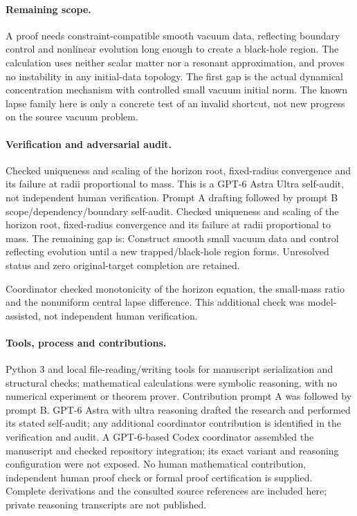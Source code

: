 \documentclass[11pt]{article}
\begin{document}
\paragraph{Remaining scope.} A proof needs constraint-compatible smooth vacuum data, reflecting boundary control and nonlinear evolution long enough to create a black-hole region. The calculation uses neither scalar matter nor a resonant approximation, and proves no instability in any initial-data topology. The first gap is the actual dynamical concentration mechanism with controlled small vacuum initial norm. The known lapse family here is only a concrete test of an invalid shortcut, not new progress on the source vacuum problem.

\paragraph{Verification and adversarial audit.}
Checked uniqueness and scaling of the horizon root, fixed-radius convergence and its failure at radii proportional to mass. This is a GPT-6 Astra Ultra self-audit, not independent human verification. Prompt A drafting followed by prompt B scope/dependency/boundary self-audit. Checked uniqueness and scaling of the horizon root, fixed-radius convergence and its failure at radii proportional to mass. The remaining gap is: Construct smooth small vacuum data and control reflecting evolution until a new trapped/black-hole region forms. Unresolved status and zero original-target completion are retained.

Coordinator checked monotonicity of the horizon equation, the small-mass ratio and the nonuniform central lapse difference. This additional check was model-assisted, not independent human verification.

\paragraph{Tools, process and contributions.}
Python 3 and local file-reading/writing tools for manuscript serialization and structural checks; mathematical calculations were symbolic reasoning, with no numerical experiment or theorem prover. Contribution prompt A was followed by prompt B. GPT-6 Astra with ultra reasoning drafted the research and performed its stated self-audit; any additional coordinator contribution is identified in the verification and audit. A GPT-6-based Codex coordinator assembled the manuscript and checked repository integration; its exact variant and reasoning configuration were not exposed. No human mathematical contribution, independent human proof check or formal proof certification is supplied. Complete derivations and the consulted source references are included here; private reasoning transcripts are not published.
\end{document}
